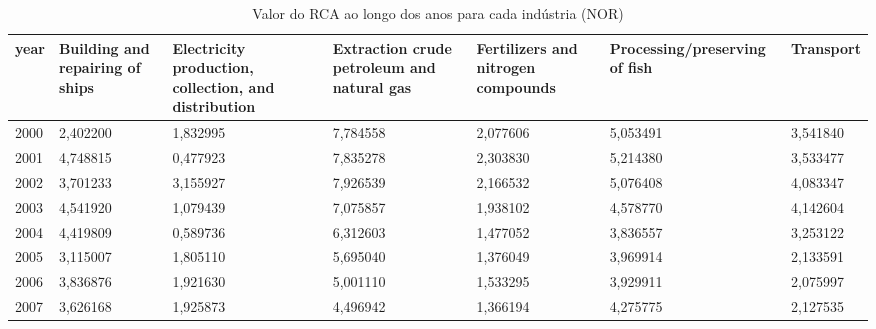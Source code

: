\begin{table}
\centering
\caption{Valor do RCA ao longo dos anos para cada indústria (NOR)}
\begin{tabular}{p{1cm}p{2cm}p{2cm}p{2cm}p{2cm}p{2cm}p{2cm}}
\toprule
 year &  Building and repairing of ships &  Electricity production, collection, and distribution &  Extraction crude petroleum and natural gas &  Fertilizers and nitrogen compounds &  Processing/preserving of fish &  Transport \\
\midrule
 2000 &                         2,402200 &                                           1,832995 &                                    7,784558 &                            2,077606 &                       5,053491 &   3,541840 \\
 2001 &                         4,748815 &                                           0,477923 &                                    7,835278 &                            2,303830 &                       5,214380 &   3,533477 \\
 2002 &                         3,701233 &                                           3,155927 &                                    7,926539 &                            2,166532 &                       5,076408 &   4,083347 \\
 2003 &                         4,541920 &                                           1,079439 &                                    7,075857 &                            1,938102 &                       4,578770 &   4,142604 \\
 2004 &                         4,419809 &                                           0,589736 &                                    6,312603 &                            1,477052 &                       3,836557 &   3,253122 \\
 2005 &                         3,115007 &                                           1,805110 &                                    5,695040 &                            1,376049 &                       3,969914 &   2,133591 \\
 2006 &                         3,836876 &                                           1,921630 &                                    5,001110 &                            1,533295 &                       3,929911 &   2,075997 \\
 2007 &                         3,626168 &                                           1,925873 &                                    4,496942 &                            1,366194 &                       4,275775 &   2,127535 \\

\end{tabular}
\end{table}
